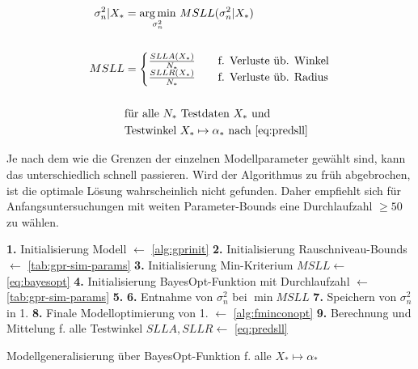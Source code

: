 \begin{align}\label{eq:bayesopt}
	\sigma_n^2|X_* &= \underset{\sigma_n^2}{\arg\min} \text{ } MSLL(\sigma_n^2|X_*) \nonumber \\
	\\
	MSLL &= 
		\begin{cases}
			\frac{SLLA(X_*)}{N_*} &\quad \text{f. Verluste üb. Winkel} \\
			\frac{SLLR(X_*)}{N_*} &\quad \text{f. Verluste üb. Radius}
		\end{cases}
\nonumber \\
\nonumber \\
& \text{für alle } N_* \text{ Testdaten } X_* \text{ und} \nonumber \\
& \text{Testwinkel } X_* \mapsto \alpha_* \text{  nach \autoref{eq:predsll}}\nonumber
\end{align}


\clearpage


Je nach dem wie die Grenzen der einzelnen Modellparameter gewählt sind, kann das unterschiedlich schnell passieren. Wird der Algorithmus zu früh abgebrochen, ist die optimale Lösung wahrscheinlich nicht gefunden. Daher empfiehlt sich für Anfangsuntersuchungen mit weiten Parameter-Bounds eine Durchlaufzahl $\ge 50$ zu wählen.


\begin{algorithm}[htp]
	\SetAlgoLined
	\textbf{1.} Initialisierung Modell $\leftarrow$ \autoref{alg:gprinit}\;
	\textbf{2.} Initialisierung Rauschniveau-Bounds $\leftarrow$ \autoref{tab:gpr-sim-params}\;
	\textbf{3.} Initialisierung Min-Kriterium $MSLL \leftarrow$ \autoref{eq:bayesopt}\;
	\textbf{4.} Initialisierung BayesOpt-Funktion mit Durchlaufzahl $\leftarrow$ \autoref{tab:gpr-sim-params}\;
	\textbf{5.} 
	\textbf{6.} Entnahme von $\sigma_n^2$ bei $\min MSLL$\;
	\textbf{7.} Speichern von $\sigma_n^2$ in 1.\;
	\textbf{8.} Finale Modelloptimierung von 1. $\leftarrow$ \autoref{alg:fminconopt}\;
	\textbf{9.} Berechnung und Mittelung f. alle Testwinkel $SLLA, SLLR \leftarrow$ \autoref{eq:predsll}\;
	\caption{Modellgeneralisierung über BayesOpt-Funktion f. alle $X_* \mapsto \alpha_*$}
	\label{alg:bayesopt}
\end{algorithm}






